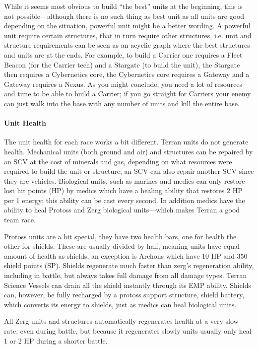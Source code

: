 While it seems most obvious to build “the best” units at the beginning, this is not
possible—although there is no such thing as best unit as all units are good depending on the
situation, powerful unit might be a better wording. A powerful unit require certain structures, that
in turn require other structures, i.e. unit and structure requirements can be seen as an acyclic
graph where the best structures and units are at the ends. For example, to build a Carrier one
requires a Fleet Beacon (for the Carrier tech) and a Stargate (to build the unit), the Stargate then
requires a Cybernetics core, the Cybernetics core requires a Gateway and a Gateway requires a Nexus.
As you might conclude, you need a lot of resources and time to be able to build a Carrier; if you go
straight for Carriers your enemy can just walk into the base with any number of units and kill the
entire base.

\paragraph{Unit Health}
The unit health for each race works a bit different. Terran units do not generate health.
Mechanical units (both ground and air) and structures can be repaired by an SCV at the cost of
minerals and gas, depending on what resources were required to build the unit or structure; an SCV
can also repair another SCV since they are vehicles. Biological units, such as marines and medics
can only restore lost hit points (HP) by medics which have a healing ability that restores 2 HP per
1 energy; this ability can be cast every second. In addition medics have the ability to heal Protoss
and Zerg biological units—which makes Terran a good team race.

Protoss units are a bit special, they have two health bars, one for health the other for shields.
These are usually divided by half, meaning units have equal amount of health as shields, an
exception is Archons which have 10 HP and 350 shield points (SP). Shields regenerate much faster
than zerg’s regeneration ability, including in battle, but always takes full damage from all damage
types. Terran Science Vessels can drain all the shield instantly through its EMP ability. Shields
can, however, be fully recharged by a protoss support structure, shield battery, which converts its
energy to shields, just as medics can heal biological units.

All Zerg units and structures automatically regenerates health at a very slow rate, even during
battle, but because it regenerates slowly units usually only heal 1 or 2 HP during a shorter battle.

